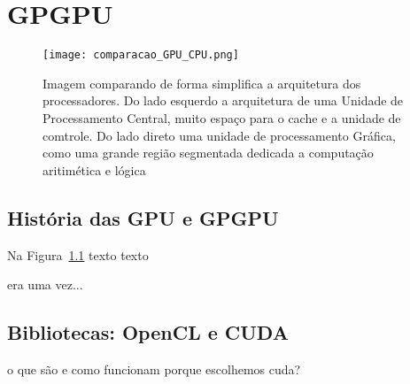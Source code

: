 \chapter{GPGPU}
\label{cap:gpgpu}

\begin{figure}[!h]
  \centering
  \texttt{[image: comparacao\_GPU\_CPU.png]}
  \caption{Imagem comparando de forma simplifica a arquitetura dos processadores. Do lado esquerdo a arquitetura de uma Unidade de Processamento Central, muito espaço para o cache e a unidade de comtrole. Do lado direto uma unidade de processamento Gráfica, como uma grande região segmentada dedicada a computação aritimética e lógica}
  \label{fig:cpuvsgpu}
\end{figure}

\section{História das GPU e GPGPU}

  Na Figura~\ref{fig:cpuvsgpu} texto texto

  era uma vez...

\section{Bibliotecas: OpenCL e CUDA}
  o que são e como funcionam
  porque escolhemos cuda?
